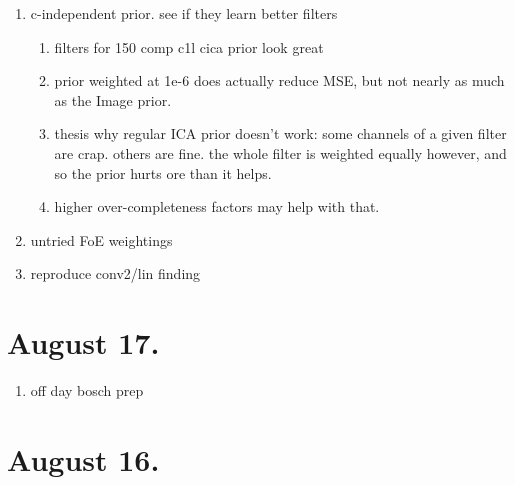 \documentclass{article}
\begin{document}
\begin{enumerate}
	\item c-independent prior. see if they learn better filters
	\begin{enumerate}
		\item filters for 150 comp c1l cica prior look great
		\item prior weighted at 1e-6 does actually reduce MSE, but not nearly as much as the Image prior.
		\item thesis why regular ICA prior doesn't work: some channels of a given filter are crap. others are fine. the whole filter is weighted equally however, and so the prior hurts ore than it helps.
		\item higher over-completeness factors may help with that.
	\end{enumerate}
	\item untried FoE weightings
	\item reproduce conv2/lin finding
\end{enumerate}



\section{August 17.}

\begin{enumerate}
	\item off day bosch prep
\end{enumerate}


\section{August 16.}
\end{document}
